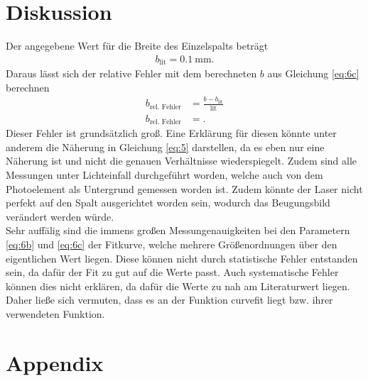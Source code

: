 \section{Diskussion}
Der angegebene Wert für die Breite des Einzelspalts beträgt
\begin{align}
    b_{\text{lit}} = \SI{0.1}{\milli\meter}. \label{eq:10}
\end{align}
Daraus lässt sich der relative Fehler mit dem berechneten $b$ aus Gleichung \eqref{eq:6c} berechnen
\begin{align}
    b_{\text{rel. Fehler}} &= \frac{b-b_{\text{lit}}}{\text{lit}} \label{eq:11}\\
    b_{\text{rel. Fehler}} &= \text{}.
\end{align}
Dieser Fehler ist grundsätzlich groß. Eine Erklärung für diesen könnte unter anderem
die Näherung in Gleichung \eqref{eq:5} darstellen, da es eben nur eine Näherung
ist und nicht die genauen Verhältnisse wiederspiegelt. Zudem sind alle Messungen
unter Lichteinfall durchgeführt worden, welche auch von dem Photoelement als Untergrund
gemessen worden ist. Zudem könnte der Laser nicht perfekt auf den Spalt ausgerichtet worden
sein, wodurch das Beugungsbild verändert werden würde.\\ Sehr auffälig sind die immens 
großen Messungenauigkeiten bei den Parametern \eqref{eq:6b} und \eqref{eq:6c} der Fitkurve,
welche mehrere Größenordnungen über den eigentlichen Wert liegen. Diese können nicht durch statistische
Fehler entstanden sein, da dafür der Fit zu gut auf die Werte passt. Auch systematische Fehler
können dies nicht erklären, da dafür die Werte zu nah am Literaturwert liegen. Daher ließe sich vermuten, dass
es an der Funktion curvefit liegt bzw. ihrer verwendeten Funktion.

\newpage
\printbibliography

\newpage
\section*{Appendix}





